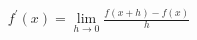 \documentclass[preview]{standalone}
\begin{document}
\begin{align*}
f^{\prime}(x) = \lim_{h \to 0} \frac{f(x+h) - f(x)}{h}
\end{align*}
\end{document}
